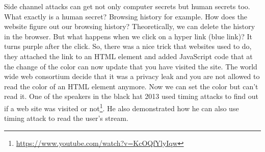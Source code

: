 Side channel attacks can get not only computer secrets but human secrets too. What exactly is a human secret? Browsing history for example. How does the website figure out our browsing history? Theoretically, we can delete the history in the browser. But what happens when we click on a hyper link (blue link)? It turns purple after the click. So, there was a nice trick that websites used to do, they attached the link to an HTML element and added JavaScript code that at the change of the color can now update that you have visited the site. The world wide web consortium decide that it was a privacy leak and you are not allowed to read the color of an HTML element anymore. Now we can set the color but can't read it. One of the speakers in the black hat 2013 used timing attacks to find out if a web site was visited or not\footnote{\url{https://www.youtube.com/watch?v=KcOQfYlyIqw}}. He also demonstrated how he can also use timing attack to read the user's stream. 